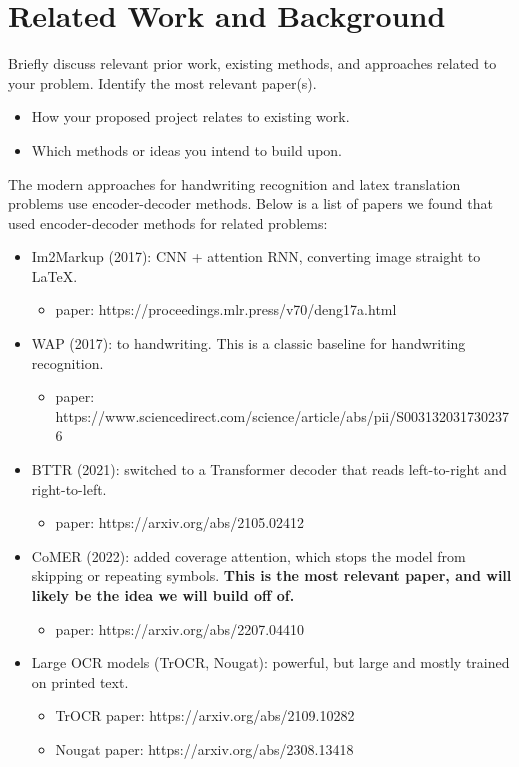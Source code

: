 \documentclass[11pt]{article}
\newcommand{\blue}[1]{\textcolor{cyan!60!black}{#1}}
\begin{document}
\section{Related Work and Background}
Briefly discuss relevant prior work, existing methods, and
approaches related to your problem. Identify the most relevant paper(s).

\begin{itemize}[noitemsep]
    \item How your proposed project relates to existing work.
    \item Which methods or ideas you intend to build upon.
\end{itemize}

\blue{
The modern approaches for handwriting recognition and latex translation problems use encoder-decoder methods.
Below is a list of papers we found that used encoder-decoder methods for related problems:
\begin{itemize}
    \item Im2Markup (2017): CNN + attention RNN, converting image straight to LaTeX.
    \begin{itemize}
        \item paper: https://proceedings.mlr.press/v70/deng17a.html
    \end{itemize}
    \item WAP (2017):  to handwriting. This is a classic baseline for handwriting recognition.
    \begin{itemize}
        \item paper: https://www.sciencedirect.com/science/article/abs/pii/S0031320317302376
    \end{itemize}
    \item BTTR (2021): switched to a Transformer decoder that reads left-to-right and right-to-left.
    \begin{itemize}
        \item paper: https://arxiv.org/abs/2105.02412
    \end{itemize}
    \item CoMER (2022): added coverage attention, which stops the model from skipping or repeating symbols.
    \textbf{This is the most relevant paper, and will likely be the idea we will build off of.}
    \begin{itemize}
        \item paper: https://arxiv.org/abs/2207.04410
    \end{itemize}
    \item Large OCR models (TrOCR, Nougat): powerful, but large and mostly trained on printed text.
    \begin{itemize}
        \item TrOCR paper: https://arxiv.org/abs/2109.10282
        \item Nougat paper: https://arxiv.org/abs/2308.13418
    \end{itemize}
\end{itemize}
}
\end{document}
